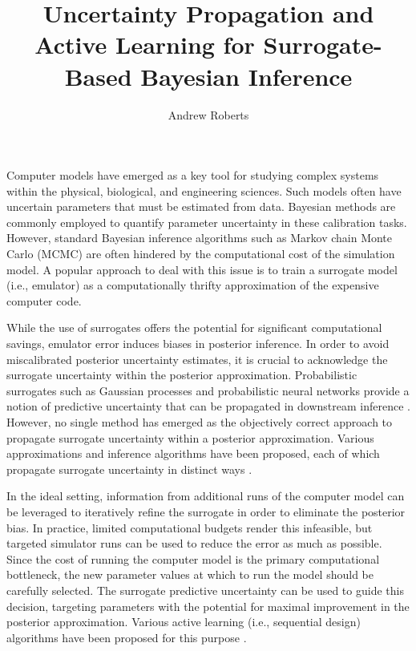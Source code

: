 \documentclass[12pt]{article}
\title{Uncertainty Propagation and Active Learning for Surrogate-Based Bayesian Inference}
\author{Andrew Roberts}
\begin{document}
\maketitle

Computer models have emerged as a key tool for studying complex systems 
within the physical, biological, and engineering sciences. Such models often have uncertain 
parameters that must be estimated from data. Bayesian methods are commonly employed
to quantify parameter uncertainty in these calibration tasks.
However, standard Bayesian inference algorithms such as Markov chain Monte Carlo (MCMC) 
are often hindered by the computational cost of the simulation model.
A popular approach to deal with this issue is to train a surrogate model 
(i.e., emulator) as a computationally thrifty approximation of the expensive computer code. 

While the use of surrogates offers the potential for significant computational savings,
emulator error induces biases in posterior inference. In order to avoid miscalibrated
posterior uncertainty estimates, it is crucial to acknowledge the surrogate uncertainty within
the posterior approximation. Probabilistic surrogates such as Gaussian processes \citep{gpML,gramacy2020surrogates} 
and probabilistic neural networks \citep{deepEnsembles,BayesOptNN} provide a notion of predictive uncertainty 
that can be propagated in downstream inference
 \citep{reviewPaper,BilionisBayesSurrogates,BurknerSurrogate,CES,FerEmulation}. 
 However, no single method has emerged as the objectively correct approach to propagate 
 surrogate uncertainty within a posterior approximation. 
 Various approximations and inference algorithms have been proposed, each of which propagate
 surrogate uncertainty in distinct ways 
 \citep{reviewPaper,BilionisBayesSurrogates,StuartTeck1,VehtariParallelGP,BurknerSurrogate,
 BurknerTwoStep,FerEmulation,garegnani2021NoisyMCMC}.

In the ideal setting, information from additional runs of the computer model can be leveraged to iteratively
refine the surrogate in order to eliminate the posterior bias. In practice, limited computational 
budgets render this infeasible, but targeted simulator runs can be used to reduce the error as much
as possible. Since the cost of running the computer model is the primary computational bottleneck,
the new parameter values at which to run the model should be carefully selected.
The surrogate predictive uncertainty can be used to guide this decision, targeting parameters with the potential 
for maximal improvement in the posterior approximation. 
Various active learning (i.e., sequential design) algorithms have been proposed for this 
purpose \citep{SinsbeckNowak,StuartTeck2,VehtariParallelGP,
Surer2023sequential, gp_surrogates_random_exploration,weightedIVAR}.
\end{document}
